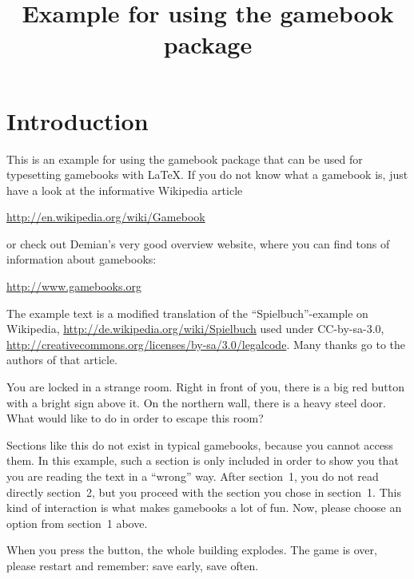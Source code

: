 \documentclass[10pt,twoside]{article}
\title{Example for using the \textsf{gamebook} package}
\author{}
\date{}
\begin{document}
	
	\maketitle
	
	\gbheader


	\section*{Introduction}
	This is an example for using the \textsf{gamebook} package that can be used for typesetting gamebooks with \LaTeX. If you do not know what a gamebook is, just have a look at the informative Wikipedia article 
	\begin{center}
	\url{http://en.wikipedia.org/wiki/Gamebook} 
	\end{center}
	or check out Demian's very good overview website, where you can find tons of information about gamebooks: 
	\begin{center}
	\url{http://www.gamebooks.org}
	\end{center}
	
	The example text is a modified translation of the ``Spielbuch''-example on Wikipedia, \url{http://de.wikipedia.org/wiki/Spielbuch} used under CC-by-sa-3.0,  \url{http://creativecommons.org/licenses/by-sa/3.0/legalcode}. Many thanks go to the authors of that article.
	
	
	You are locked in a strange room. Right in front of you, there is a big red button with a bright sign above it. On the northern wall, there is a heavy steel door. What would like to do in order to escape this room?
	\begin{gbturnoptions}
	\end{gbturnoptions}
	
	
	Sections like this do not exist in typical gamebooks, because you cannot access them. In this example, such a section is only included in order to show you that you are reading the text in a ``wrong'' way. After section~1, you do not read directly section~2, but you proceed with the section you chose in section~1. This kind of interaction is what makes gamebooks a lot of fun. Now, please choose an option from section~1 above.
	
	
	When you press the button, the whole building explodes. The game is over, please restart and remember: save early, save often.
	
\end{document}
